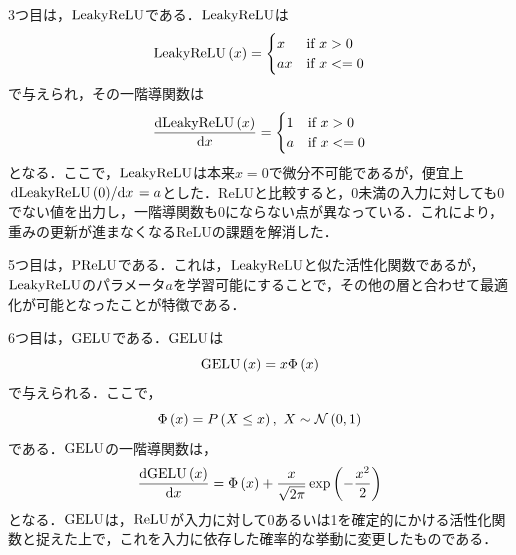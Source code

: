 3つ目は，$\text{LeakyReLU}$\cite{maas2013rectifier}である．$\text{LeakyReLU}$は
\begin{equation}
    \text{LeakyReLU}\left(x\right) =
    \begin{cases}
        x  & \text{if $x > 0$}  \\
        ax & \text{if $x <= 0$}
    \end{cases}
\end{equation}
で与えられ，その一階導関数は
\begin{equation}
    \dv{\text{LeakyReLU}\left(x\right)}{x} =
    \begin{cases}
        1 & \text{if $x > 0$}  \\
        a & \text{if $x <= 0$}
    \end{cases}
\end{equation}
となる．ここで，$\text{LeakyReLU}$は本来$x = 0$で微分不可能であるが，便宜上$\dv*{\text{LeakyReLU}\left(0\right)}{x} = a$とした．ReLUと比較すると，0未満の入力に対しても0でない値を出力し，一階導関数も0にならない点が異なっている．これにより，重みの更新が進まなくなるReLUの課題を解消した．

5つ目は，$\text{PReLU}$\cite{he2015delving}である．これは，$\text{LeakyReLU}$と似た活性化関数であるが，$\text{LeakyReLU}$のパラメータ$a$を学習可能にすることで，その他の層と合わせて最適化が可能となったことが特徴である．

6つ目は，$\text{GELU}$\cite{hendrycks2016gaussian}である．$\text{GELU}$は
\begin{equation}
    \text{GELU}\left(x\right) = x \Phi\left(x\right)
\end{equation}
で与えられる．ここで，
\begin{equation}
    \Phi\left(x\right) = P\left(X \le x\right), ~ X \sim \mathcal{N} \left(0, 1\right)
\end{equation}
である．$\text{GELU}$の一階導関数は，
\begin{equation}
    \dv{\text{GELU}\left(x\right)}{x} = \Phi\left(x\right) + \frac{x}{\sqrt{2\pi}}\exp\left(-\frac{x^{2}}{2}\right)
\end{equation}
となる．$\text{GELU}$は，$\text{ReLU}$が入力に対して0あるいは1を確定的にかける活性化関数と捉えた上で，これを入力に依存した確率的な挙動に変更したものである．

